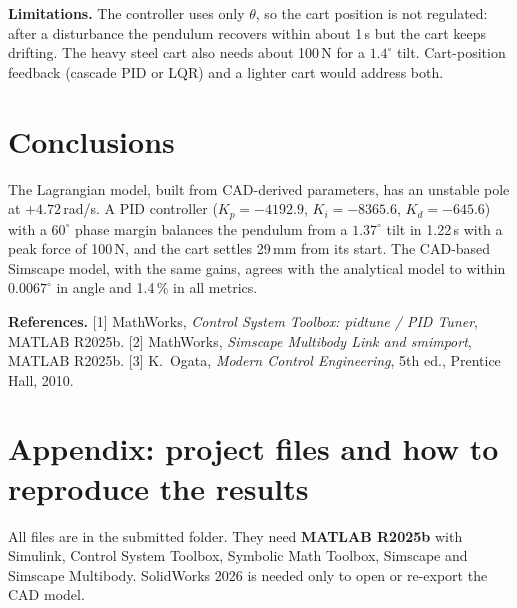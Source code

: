\documentclass[10pt,a4paper]{article}
\begin{document}
\textbf{Limitations.} The controller uses only $\theta$, so the cart position is not regulated: after a
disturbance the pendulum recovers within about 1\,s but the cart keeps drifting. The heavy steel cart also
needs about 100\,N for a $1.4^\circ$ tilt. Cart-position feedback (cascade PID or LQR) and a lighter cart would
address both.

\section{Conclusions}
The Lagrangian model, built from CAD-derived parameters, has an unstable pole at $+4.72$\,rad/s. A PID
controller ($K_p=-4192.9$, $K_i=-8365.6$, $K_d=-645.6$) with a $60^\circ$ phase margin balances the pendulum
from a $1.37^\circ$ tilt in 1.22\,s with a peak force of 100\,N, and the cart settles 29\,mm from its start.
The CAD-based Simscape model, with the same gains, agrees with the analytical model to within
$0.0067^\circ$ in angle and 1.4\,\% in all metrics.

{\small\textbf{References.}
[1] MathWorks, \emph{Control System Toolbox: pidtune / PID Tuner}, MATLAB R2025b.
[2] MathWorks, \emph{Simscape Multibody Link and smimport}, MATLAB R2025b.
[3] K.~Ogata, \emph{Modern Control Engineering}, 5th ed., Prentice Hall, 2010.}

\clearpage
\section*{Appendix: project files and how to reproduce the results}
All files are in the submitted folder. They need \textbf{MATLAB R2025b} with Simulink, Control System
Toolbox, Symbolic Math Toolbox, Simscape and Simscape Multibody. SolidWorks 2026 is needed only to open or
re-export the CAD model.
\end{document}
